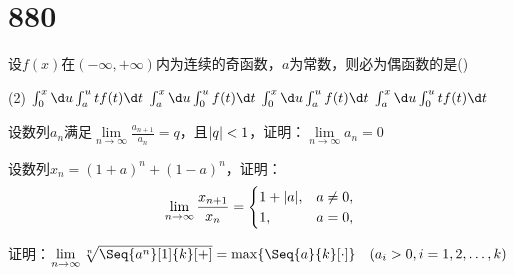 \section{880}
\begin{question}
设$f(x)$在$(-\infty,+\infty)$内为连续的奇函数，$a$为常数，则必为偶函数的是(\quad)
\begin{tasks}(2)
    \task $\int_{0}^{x} \d u \int_{a}^{u} tf(t) \d t$
    \task $\int_{a}^{x} \d u \int_{0}^{u} f(t) \d t$
    \task $\int_{0}^{x} \d u \int_{a}^{u} f(t) \d t$
    \task $\int_{a}^{x} \d u \int_{0}^{u} tf(t) \d t$
\end{tasks}
\end{question}

\begin{question}
    设数列$ {a_n} $满足$ \lim\limits_{n \to \infty} \frac{a_{n+1}}{a_n} = q $，且$ \lvert q\rvert < 1 $，证明：$ \lim\limits_{n \to \infty} a_n = 0 $
\end{question}

\begin{question}
    设数列$ x_n = (1 + a) ^ n + (1 - a) ^ n $，证明：
    \begin{equation}
        \nonumber
         \lim\limits_{n \to \infty} \frac{x_{n + 1}}{x_n} = 
         \begin{cases}
            1 + \lvert a\rvert,  &a \neq 0, \\
            1,            &a = 0,
         \end{cases}
    \end{equation}
\end{question}

\begin{question}
    证明：$ \lim\limits_{n \to \infty} \sqrt[n]{\Seq{a ^ n}[1]{k}[+]} = \max \{\Seq{a}{k}[\cdot]\} \quad (a_i > 0, i = 1, 2, \dots , k)$
\end{question}